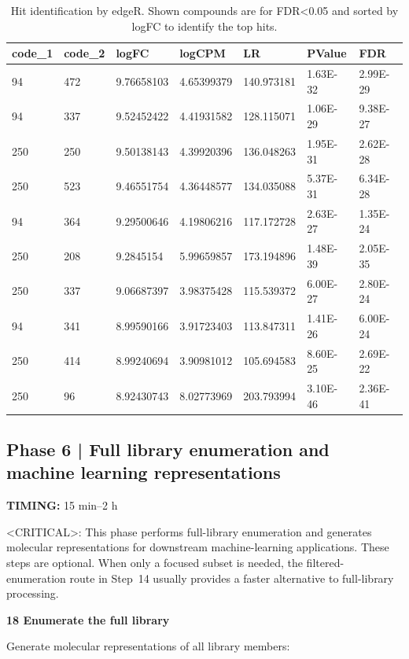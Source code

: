 \documentclass[pdflatex,sn-nature]{sn-jnl}
\newcommand{\protocolstep}[2]{\par\medskip\noindent\textbf{#1 \textbar{} #2}\par}
\begin{document}
\begin{table}[htbp]
\centering
\caption{Hit identification by edgeR. Shown compounds are for FDR\textless{}0.05 and sorted by logFC to identify the top hits.}
\label{tab:table12}
\begin{tabular}{lllllll}
\toprule
code\_1 & code\_2 & logFC & logCPM & LR & PValue & FDR \\
\midrule
94 & 472 & 9.76658103 & 4.65399379 & 140.973181 & 1.63E-32 & 2.99E-29 \\
94 & 337 & 9.52452422 & 4.41931582 & 128.115071 & 1.06E-29 & 9.38E-27 \\
250 & 250 & 9.50138143 & 4.39920396 & 136.048263 & 1.95E-31 & 2.62E-28 \\
250 & 523 & 9.46551754 & 4.36448577 & 134.035088 & 5.37E-31 & 6.34E-28 \\
94 & 364 & 9.29500646 & 4.19806216 & 117.172728 & 2.63E-27 & 1.35E-24 \\
250 & 208 & 9.2845154 & 5.99659857 & 173.194896 & 1.48E-39 & 2.05E-35 \\
250 & 337 & 9.06687397 & 3.98375428 & 115.539372 & 6.00E-27 & 2.80E-24 \\
94 & 341 & 8.99590166 & 3.91723403 & 113.847311 & 1.41E-26 & 6.00E-24 \\
250 & 414 & 8.99240694 & 3.90981012 & 105.694583 & 8.60E-25 & 2.69E-22 \\
250 & 96 & 8.92430743 & 8.02773969 & 203.793994 & 3.10E-46 & 2.36E-41 \\
\bottomrule
\end{tabular}
\end{table}

\subsection{Phase 6 | Full library enumeration and machine learning representations}

\textbf{TIMING:} 15 min--2 h

<CRITICAL>: This phase performs full-library enumeration and generates molecular representations for downstream machine-learning applications. These steps are optional. When only a focused subset is needed, the filtered-enumeration route in Step~14 usually provides a faster alternative to full-library processing.

\protocolstep{18}{Enumerate the full library}

Generate molecular representations of all library members: 
\end{document}
